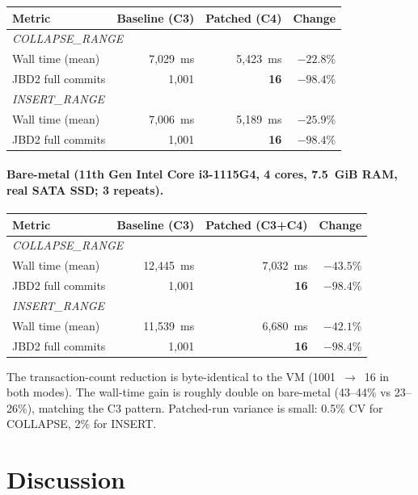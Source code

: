 \documentclass[11pt,a4paper]{article}
\begin{document}
\begin{center}
\begin{tabular}{lrrr}
\toprule
Metric & Baseline (C3) & Patched (C4) & Change \\
\midrule
\multicolumn{4}{l}{\textit{COLLAPSE\_RANGE}} \\
Wall time (mean)  & 7{,}029~ms & 5{,}423~ms & $-22.8\%$ \\
JBD2 full commits & 1{,}001 & \textbf{16} & $\mathbf{-98.4\%}$ \\
\midrule
\multicolumn{4}{l}{\textit{INSERT\_RANGE}} \\
Wall time (mean)  & 7{,}006~ms & 5{,}189~ms & $-25.9\%$ \\
JBD2 full commits & 1{,}001 & \textbf{16} & $\mathbf{-98.4\%}$ \\
\bottomrule
\end{tabular}
\end{center}

\paragraph{Bare-metal (11th Gen Intel Core i3-1115G4, 4
cores, 7.5~GiB RAM, real SATA SSD; 3 repeats).}

\begin{center}
\begin{tabular}{lrrr}
\toprule
Metric & Baseline (C3) & Patched (C3+C4) & Change \\
\midrule
\multicolumn{4}{l}{\textit{COLLAPSE\_RANGE}} \\
Wall time (mean)  & 12{,}445~ms & 7{,}032~ms & $-43.5\%$ \\
JBD2 full commits & 1{,}001 & \textbf{16} & $\mathbf{-98.4\%}$ \\
\midrule
\multicolumn{4}{l}{\textit{INSERT\_RANGE}} \\
Wall time (mean)  & 11{,}539~ms & 6{,}680~ms & $-42.1\%$ \\
JBD2 full commits & 1{,}001 & \textbf{16} & $\mathbf{-98.4\%}$ \\
\bottomrule
\end{tabular}
\end{center}

The transaction-count reduction is byte-identical to the VM
(1001~$\to$~16 in both modes). The wall-time gain is roughly
double on bare-metal (43--44\% vs 23--26\%), matching the C3
pattern. Patched-run variance is small: 0.5\% CV for COLLAPSE,
2\% for INSERT.

\section{Discussion}
\end{document}
